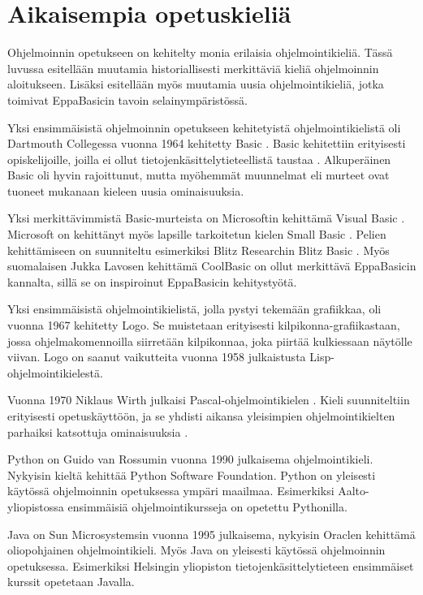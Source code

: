
\section{Aikaisempia opetuskieliä}
Ohjelmoinnin opetukseen on kehitelty
monia erilaisia ohjelmointikieliä.
Tässä luvussa esitellään muutamia
historiallisesti merkittäviä
kieliä ohjelmoinnin aloitukseen.
Lisäksi esitellään myös muutamia uusia
ohjelmointikieliä, jotka toimivat
EppaBasicin tavoin selainympäristössä.

Yksi ensimmäisistä ohjelmoinnin
opetukseen kehitetyistä
ohjelmointikielistä oli
Dartmouth Collegessa vuonna 1964
kehitetty Basic \cite{basic}.
Basic kehitettiin erityisesti
opiskelijoille, joilla ei ollut
tietojenkäsittelytieteellistä
taustaa \cite{language_history}.
Alkuperäinen Basic oli hyvin
rajoittunut, mutta myöhemmät muunnelmat
eli murteet ovat tuoneet mukanaan
kieleen uusia ominaisuuksia.

Yksi merkittävimmistä
Basic-murteista on
Microsoftin kehittämä
Visual Basic \cite{vb.net}.
Microsoft on kehittänyt myös
lapsille tarkoitetun kielen
Small Basic \cite{sb}.
Pelien kehittämiseen on suunniteltu
esimerkiksi Blitz Researchin
Blitz Basic \cite{bb}.
Myös suomalaisen
Jukka Lavosen kehittämä
CoolBasic \cite{cb} on ollut merkittävä
EppaBasicin kannalta, sillä
se on inspiroinut EppaBasicin
kehitystyötä.

Yksi ensimmäisistä ohjelmointikielistä,
jolla pystyi tekemään grafiikkaa,
oli vuonna 1967 kehitetty Logo.
Se muistetaan erityisesti
kilpikonna-grafiikastaan,
jossa ohjelmakomennoilla
siirretään kilpikonnaa,
joka piirtää kulkiessaan
näytölle viivan.
Logo on saanut vaikutteita vuonna 1958
julkaistusta Lisp-ohjelmointikielestä.

Vuonna 1970 Niklaus Wirth
julkaisi Pascal-ohjelmointikielen
\cite{pascal}.
Kieli suunniteltiin erityisesti
opetuskäyttöön, ja se yhdisti
aikansa yleisimpien ohjelmointikielten
parhaiksi katsottuja ominaisuuksia
\cite{language_history}.

Python \cite{python} on
Guido van Rossumin vuonna 1990
julkaisema ohjelmointikieli.
Nykyisin kieltä kehittää
Python Software Foundation.
Python on yleisesti käytössä ohjelmoinnin
opetuksessa ympäri maailmaa.
Esimerkiksi Aalto-yliopistossa
ensimmäisiä ohjelmointikursseja
on opetettu Pythonilla.

Java \cite{java} on Sun Microsystemsin
vuonna 1995 julkaisema,
nykyisin Oraclen kehittämä
oliopohjainen ohjelmointikieli.
Myös Java on yleisesti käytössä
ohjelmoinnin opetuksessa.
Esimerkiksi Helsingin yliopiston
tietojenkäsittelytieteen ensimmäiset
kurssit opetetaan Javalla.

